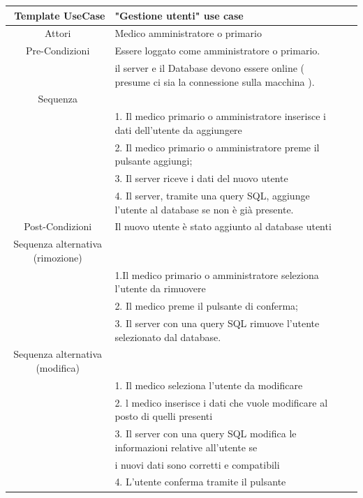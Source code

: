 \documentclass{article}
\begin{document}
\begin{center}

	\begin{tabular}{r@{\vspace{0.4cm}}ll}
	

	\hline
	
	\textbf{Template UseCase} & \textbf{          "Gestione utenti" use case } \\

	\hline
	
	\multicolumn{1}{c}{Attori}  & Medico amministratore o primario
 \\

	\cline{1-1}
\hline

	\multicolumn{1}{c}{Pre-Condizioni}  & Essere loggato come amministratore o primario.\\&
il server e il Database devono essere online ( presume ci sia la connessione sulla macchina ).\\

\hline
	\multicolumn{1}{c}{Sequenza}    \\ \cline{1-1}&
 1. Il medico primario o amministratore inserisce i dati dell’utente da aggiungere \\&
    2.    Il medico primario o amministratore preme il pulsante aggiungi; \\&
    3. Il server riceve i dati del nuovo utente\\&
    4. Il server, tramite una query SQL, aggiunge l’utente al database se non è già presente. \\
   
\hline
	
\multicolumn{1}{c}{Post-Condizioni}  &Il nuovo utente è stato aggiunto al database utenti\\ \cline{1-1}
\hline

\multicolumn{1}{c}{Sequenza alternativa (rimozione)}  \\     \cline{1-1}&

1.Il medico primario o amministratore seleziona l’utente da rimuovere \\&
         2. Il medico preme il pulsante di conferma;\\&
            3. Il server con una query SQL rimuove l’utente selezionato dal database.\\
\hline

\multicolumn{1}{c}{Sequenza alternativa (modifica)}  \\     \cline{1-1}&

1. Il medico seleziona l’utente da modificare \\&
     2. l medico inserisce i dati che vuole modificare al posto di quelli presenti\\&
        3. Il server con una query SQL modifica le informazioni relative all’utente se\\& i nuovi dati sono corretti e compatibili  \\&
	    4. L’utente conferma tramite il pulsante  \\

\hline

	\end{tabular}

\end{center}
\end{document}
